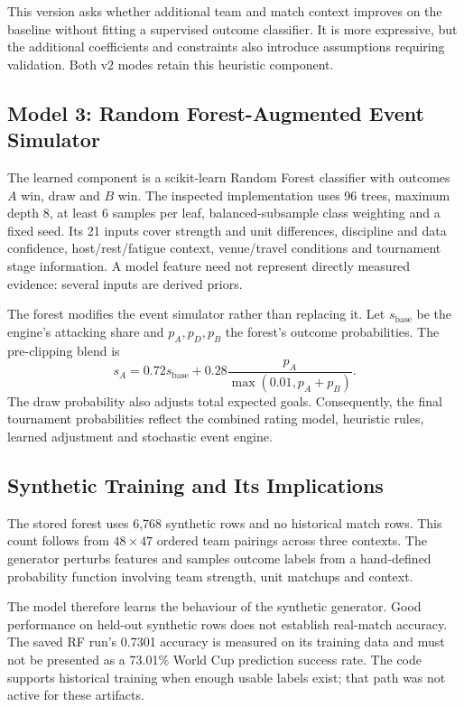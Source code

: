 \documentclass[11pt,a4paper]{article}
\begin{document}
This version asks whether additional team and match context improves on the
baseline without fitting a supervised outcome classifier. It is more expressive,
but the additional coefficients and constraints also introduce assumptions
requiring validation. Both v2 modes retain this heuristic component.
\subsection{Model 3: Random Forest-Augmented Event Simulator}
The learned component is a scikit-learn Random Forest classifier with outcomes
$A$ win, draw and $B$ win. The inspected implementation uses 96 trees, maximum
depth 8, at least 6 samples per leaf, balanced-subsample class weighting and a
fixed seed. Its 21 inputs cover strength and unit differences, discipline and
data confidence, host/rest/fatigue context, venue/travel conditions and tournament
stage information. A model feature need not represent directly measured evidence:
several inputs are derived priors.

The forest modifies the event simulator rather than replacing it. Let
$s_{\mathrm{base}}$ be the engine's attacking share and $p_A,p_D,p_B$ the forest's
outcome probabilities. The pre-clipping blend is
\begin{equation}
s_A=0.72s_{\mathrm{base}}+
0.28\frac{p_A}{\max(0.01,p_A+p_B)}.
\end{equation}
The draw probability also adjusts total expected goals. Consequently, the final
tournament probabilities reflect the combined rating model, heuristic rules,
learned adjustment and stochastic event engine.
\subsection{Synthetic Training and Its Implications}
The stored forest uses 6,768 synthetic rows and no historical match rows. This
count follows from $48\times47$ ordered team pairings across three contexts.
The generator perturbs features and samples outcome labels from a hand-defined
probability function involving team strength, unit matchups and context.

The model therefore learns the behaviour of the synthetic generator. Good
performance on held-out synthetic rows does not establish real-match accuracy.
The saved RF run's 0.7301 accuracy is measured on its training data and must not
be presented as a 73.01\% World Cup prediction success rate. The code supports
historical training when enough usable labels exist; that path was not active
for these artifacts.
\clearpage
\end{document}
